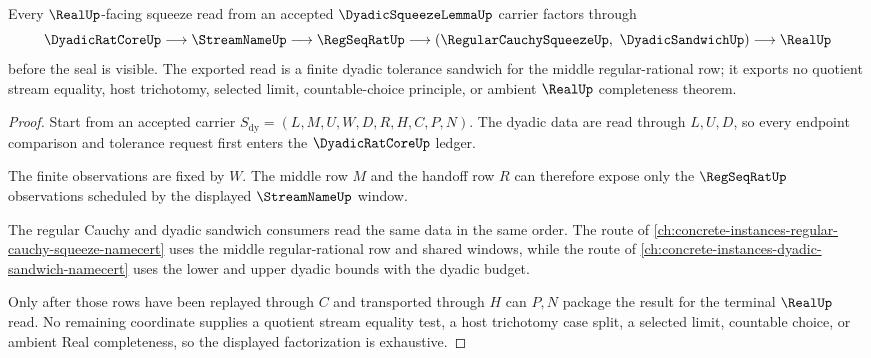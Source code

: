 \begin{theorem}
\label{thm:dyadic-squeeze-lemma-real-handoff}
Every $\RealUp$-facing squeeze read from an accepted $\DyadicSqueezeLemmaUp$ carrier factors through
$$
\DyadicRatCoreUp \longrightarrow \StreamNameUp \longrightarrow \RegSeqRatUp \longrightarrow
\left(\RegularCauchySqueezeUp,\ \DyadicSandwichUp\right) \longrightarrow \RealUp
$$
before the seal is visible. The exported read is a finite dyadic tolerance sandwich for the middle regular-rational row; it exports no quotient stream equality, host trichotomy, selected limit, countable-choice principle, or ambient $\RealUp$ completeness theorem.
\end{theorem}
\begin{proof}
Start from an accepted carrier $S_{\mathrm{dy}}=(L,M,U,W,D,R,H,C,P,N)$. The dyadic data are read through $L,U,D$, so every endpoint comparison and tolerance request first enters the $\DyadicRatCoreUp$ ledger.

The finite observations are fixed by $W$. The middle row $M$ and the handoff row $R$ can therefore expose only the $\RegSeqRatUp$ observations scheduled by the displayed $\StreamNameUp$ window.

The regular Cauchy and dyadic sandwich consumers read the same data in the same order. The route of \autoref{ch:concrete-instances-regular-cauchy-squeeze-namecert} uses the middle regular-rational row and shared windows, while the route of \autoref{ch:concrete-instances-dyadic-sandwich-namecert} uses the lower and upper dyadic bounds with the dyadic budget.

Only after those rows have been replayed through $C$ and transported through $H$ can $P,N$ package the result for the terminal $\RealUp$ read. No remaining coordinate supplies a quotient stream equality test, a host trichotomy case split, a selected limit, countable choice, or ambient Real completeness, so the displayed factorization is exhaustive.
\end{proof}


